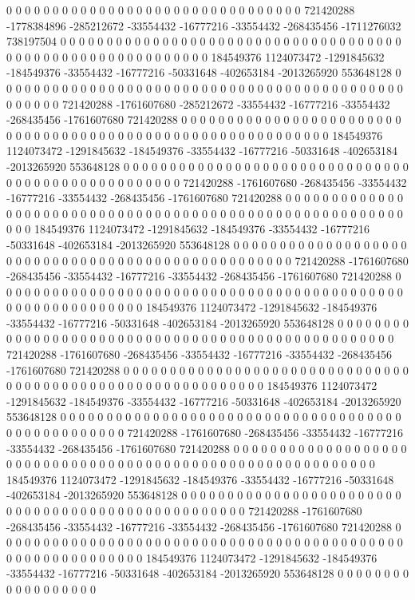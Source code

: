 0 0 0 0 0 0 0 0 0 0 0 0 0 0 0 0 0 0 0 0 0 0 0 0 0 0 0 0 0 0 0 0 721420288 -1778384896 -285212672 -33554432 -16777216 -33554432 -268435456 -1711276032 738197504 0 0 0 0 0 0 0 0 0 0 0 0 0 0 0 0 0 0 0 0 0 0 0 0 0 0 0 0 0 0 0 0 0 0 0 0 0 0 0 0 0 0 0 0 0 0 0 0 0 0 0 0 0 0 0 0 0 0 0 184549376 1124073472 -1291845632 -184549376 -33554432 -16777216 -50331648 -402653184 -2013265920 553648128 0 0 0 0 0 0 0 0 0 0 0 0 0 0 0 0 0 0
0 0 0 0 0 0 0 0 0 0 0 0 0 0 0 0 0 0 0 0 0 0 0 0 0 0 0 0 0 0 0 0 721420288 -1761607680 -285212672 -33554432 -16777216 -33554432 -268435456 -1761607680 721420288 0 0 0 0 0 0 0 0 0 0 0 0 0 0 0 0 0 0 0 0 0 0 0 0 0 0 0 0 0 0 0 0 0 0 0 0 0 0 0 0 0 0 0 0 0 0 0 0 0 0 0 0 0 0 0 0 0 0 0 184549376 1124073472 -1291845632 -184549376 -33554432 -16777216 -50331648 -402653184 -2013265920 553648128 0 0 0 0 0 0 0 0 0 0 0 0 0 0 0 0 0 0
0 0 0 0 0 0 0 0 0 0 0 0 0 0 0 0 0 0 0 0 0 0 0 0 0 0 0 0 0 0 0 0 721420288 -1761607680 -268435456 -33554432 -16777216 -33554432 -268435456 -1761607680 721420288 0 0 0 0 0 0 0 0 0 0 0 0 0 0 0 0 0 0 0 0 0 0 0 0 0 0 0 0 0 0 0 0 0 0 0 0 0 0 0 0 0 0 0 0 0 0 0 0 0 0 0 0 0 0 0 0 0 0 0 184549376 1124073472 -1291845632 -184549376 -33554432 -16777216 -50331648 -402653184 -2013265920 553648128 0 0 0 0 0 0 0 0 0 0 0 0 0 0 0 0 0 0
0 0 0 0 0 0 0 0 0 0 0 0 0 0 0 0 0 0 0 0 0 0 0 0 0 0 0 0 0 0 0 0 721420288 -1761607680 -268435456 -33554432 -16777216 -33554432 -268435456 -1761607680 721420288 0 0 0 0 0 0 0 0 0 0 0 0 0 0 0 0 0 0 0 0 0 0 0 0 0 0 0 0 0 0 0 0 0 0 0 0 0 0 0 0 0 0 0 0 0 0 0 0 0 0 0 0 0 0 0 0 0 0 0 184549376 1124073472 -1291845632 -184549376 -33554432 -16777216 -50331648 -402653184 -2013265920 553648128 0 0 0 0 0 0 0 0 0 0 0 0 0 0 0 0 0 0
0 0 0 0 0 0 0 0 0 0 0 0 0 0 0 0 0 0 0 0 0 0 0 0 0 0 0 0 0 0 0 0 721420288 -1761607680 -268435456 -33554432 -16777216 -33554432 -268435456 -1761607680 721420288 0 0 0 0 0 0 0 0 0 0 0 0 0 0 0 0 0 0 0 0 0 0 0 0 0 0 0 0 0 0 0 0 0 0 0 0 0 0 0 0 0 0 0 0 0 0 0 0 0 0 0 0 0 0 0 0 0 0 0 184549376 1124073472 -1291845632 -184549376 -33554432 -16777216 -50331648 -402653184 -2013265920 553648128 0 0 0 0 0 0 0 0 0 0 0 0 0 0 0 0 0 0
0 0 0 0 0 0 0 0 0 0 0 0 0 0 0 0 0 0 0 0 0 0 0 0 0 0 0 0 0 0 0 0 721420288 -1761607680 -268435456 -33554432 -16777216 -33554432 -268435456 -1761607680 721420288 0 0 0 0 0 0 0 0 0 0 0 0 0 0 0 0 0 0 0 0 0 0 0 0 0 0 0 0 0 0 0 0 0 0 0 0 0 0 0 0 0 0 0 0 0 0 0 0 0 0 0 0 0 0 0 0 0 0 0 184549376 1124073472 -1291845632 -184549376 -33554432 -16777216 -50331648 -402653184 -2013265920 553648128 0 0 0 0 0 0 0 0 0 0 0 0 0 0 0 0 0 0
0 0 0 0 0 0 0 0 0 0 0 0 0 0 0 0 0 0 0 0 0 0 0 0 0 0 0 0 0 0 0 0 721420288 -1761607680 -268435456 -33554432 -16777216 -33554432 -268435456 -1761607680 721420288 0 0 0 0 0 0 0 0 0 0 0 0 0 0 0 0 0 0 0 0 0 0 0 0 0 0 0 0 0 0 0 0 0 0 0 0 0 0 0 0 0 0 0 0 0 0 0 0 0 0 0 0 0 0 0 0 0 0 0 184549376 1124073472 -1291845632 -184549376 -33554432 -16777216 -50331648 -402653184 -2013265920 553648128 0 0 0 0 0 0 0 0 0 0 0 0 0 0 0 0 0 0
